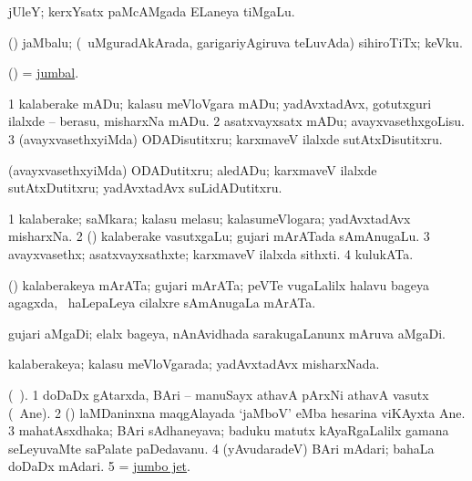 \bentry
{}
\gl{\nA}
\bmng
jUleY; kerxYsatx paMcAMgada ELaneya tiMgaLu. 
\emng
\eentry

\bentry
{}
\gl{\nA}
\bmng
(\ame) jaMbalu; (\sA\ uMguradAkArada, garigariyAgiruva teLuvAda) sihiroTiTx; keVku. 
\emng
\eentry

\bentry
{}
\gl{\nA}
\bmng
(\ame)  = \hyperlink{jumbal}{jumbal}. 
\emng
\eentry


\bentry
{}
\gl{\sakirx}
\bmng
\bnum
\num{1} kalaberake mADu; kalasu meVloVgara mADu; yadAvxtadAvx, gotutxguri ilalxde -- berasu, misharxNa mADu. 
\num{2} asatxvayxsatx mADu; avayxvasethxgoLisu. 
\num{3} (avayxvasethxyiMda) ODADisutitxru; karxmaveV ilalxde sutAtxDisutitxru. 
\enum
\emng

\noindent
\gl{\akirx}
\bmng
(avayxvasethxyiMda) ODADutitxru; aledADu; karxmaveV ilalxde sutAtxDutitxru; yadAvxtadAvx suLidADutitxru. 
\emng
\eentry


\bentry
{}
\gl{\nA}
\bmng
\bnum
\num{1} kalaberake; saMkara; kalasu melasu; kalasumeVlogara; yadAvxtadAvx misharxNa. 
\num{2} (\birx) kalaberake vasutxgaLu; gujari mArATada sAmAnugaLu. 
\num{3} avayxvasethx; asatxvayxsathxte; karxmaveV ilalxda sithxti. 
\num{4} kulukATa. 
\enum
\emng
\eentry

\bentry
{}
\gl{\nA}
\bmng
(\birx) kalaberakeya mArATa; gujari mArATa; peVTe \mo vugaLalilx halavu bageya agagxda, \sA\ haLepaLeya cilalxre sAmAnugaLa mArATa. 
\emng
\eentry

\bentry
{}
\gl{\nA}
\bmng
gujari aMgaDi; elalx bageya, nAnAvidhada sarakugaLanunx mAruva aMgaDi. 
\emng
\eentry

\bentry
{}
\gl{\gu}
\bmng
kalaberakeya; kalasu meVloVgarada; yadAvxtadAvx misharxNada. 
\emng
\eentry


\bentry
{}
\gl{\nA}
\bmng
(\bava\ ). 
\bnum
\num{1} doDaDx gAtarxda, BAri -- manuSayx athavA pArxNi athavA vasutx (\kanmu\ Ane). 
\num{2} (\kanmu) laMDaninxna maqgAlayada `jaMboV' eMba hesarina viKAyxta Ane. 
\num{3} mahatAsxdhaka; BAri sAdhaneyava; baduku matutx kAyaRgaLalilx gamana seLeyuvaMte saPalate paDedavanu. 
\num{4} (yAvudaradeV) BAri mAdari; bahaLa doDaDx mAdari. 
\num{5}  = \hyperlink{jumbo jet}{jumbo jet}. 
\enum
\emng
\eentry



